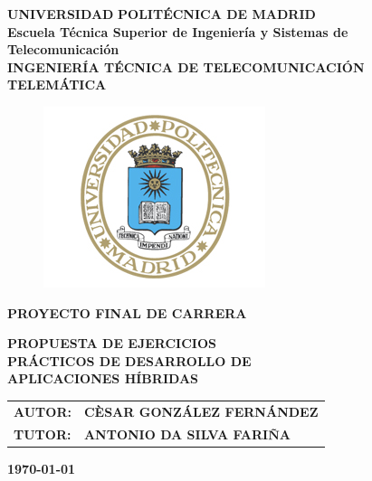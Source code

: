\linespread{1}
\begin{titlepage}
\begin{center}
{\large\textbf{UNIVERSIDAD}}
 {\large\textbf{POLITÉCNICA DE MADRID}}\\
 \vspace{0.8cm}
{\large\textbf {Escuela Técnica Superior de Ingeniería y Sistemas de Telecomunicación}}\\
 \vspace{0.8cm}
{\large\textbf{INGENIERÍA TÉCNICA  DE TELECOMUNICACIÓN}}\\
{\large\textbf {TELEMÁTICA}}
\end{center}

\begin{figure}
\centering
\includegraphics[scale=1]{Figures/escudoUpm.jpg}
\end{figure}


\begin{center}
{\large\textbf {PROYECTO FINAL DE CARRERA}}\\ \vspace{1.5cm}

{\Large \bf PROPUESTA DE EJERCICIOS}\\ \vspace{0.2cm}
{\Large \bf PRÁCTICOS DE DESARROLLO DE}\\ \vspace{0.2cm}
{\Large \bf APLICACIONES HÍBRIDAS}\\ \vspace{0.2cm}
\end{center}


\begin{table}[h]
    \begin{flushright}
        \begin{tabular}{l @{\quad} l}
            \textbf{AUTOR:} & \textbf{CÈSAR GONZÁLEZ FERNÁNDEZ}\\
            \textbf{TUTOR:} & \textbf{ANTONIO DA SILVA FARIÑA}\\
        \end{tabular}
        \end{flushright}
\end{table}
\begin{flushright}
{\large \textbf{\today}}
\end{flushright}

\end{titlepage}

